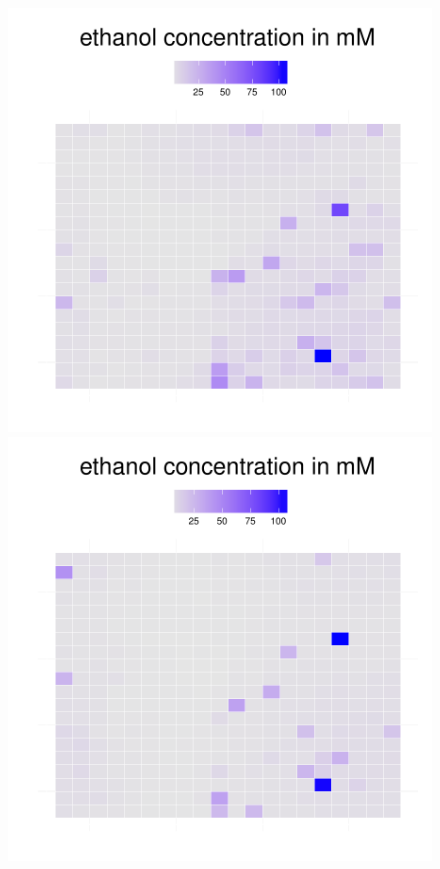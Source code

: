 \begin{figure}[h!]
{\begin{minipage}[t]{0.3\textwidth}
  \end{minipage}
  \begin{minipage}[t]{0.3\textwidth}
    \includegraphics[width=\textwidth]{../results/ecoli_beijerinckii_20x20_seed5147_etoh55.pdf}
  \end{minipage}
  \begin{minipage}[t]{0.3\textwidth}
    \includegraphics[width=\textwidth]{../results/ecoli_beijerinckii_20x20_seed5147_etoh75.pdf}

\end{minipage}}
\end{figure}
